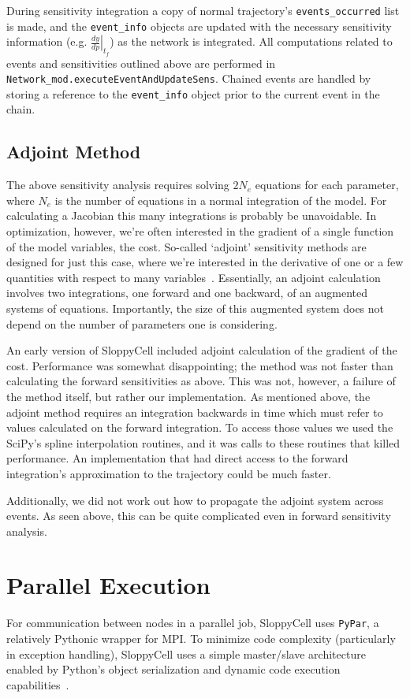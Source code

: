 \documentclass[12pt]{article}
\makeatletter
\newcommand{\py}[1]{\lstinline[language=Python, showstringspaces=False]@#1@}
\makeatother
\begin{document}
During sensitivity integration a copy of normal trajectory's \py{events_occurred} list is made, and the \py{event_info} objects are updated with the necessary sensitivity information (e.g. $\left.\frac{dy}{dp}\right|_{t_f}$) as the network is integrated.
All computations related to events and sensitivities outlined above are performed in \py{Network_mod.executeEventAndUpdateSens}.
Chained events are handled by storing a reference to the \py{event_info} object prior to the current event in the chain.

\subsection{Adjoint Method}
The above sensitivity analysis requires solving $2N_e$ equations for each parameter, where $N_e$ is the number of equations in a normal integration of the model.
For calculating a Jacobian this many integrations is probably be unavoidable.
In optimization, however, we're often interested in the gradient of a single function of the model variables, the cost.
So-called `adjoint' sensitivity methods are designed for just this case, where we're interested in the derivative of one or a few quantities with respect to many variables~\cite{bib:Errico:1997,bib:Cao2002}.
Essentially, an adjoint calculation involves two integrations, one forward and one backward, of an augmented systems of equations.
Importantly, the size of this augmented system does not depend on the number of parameters one is considering.

An early version of SloppyCell included adjoint calculation of the gradient of the cost.
Performance was somewhat disappointing; the method was not faster than calculating the forward sensitivities as above.
This was not, however, a failure of the method itself, but rather our implementation.
As mentioned above, the adjoint method requires an integration backwards in time which must refer to values calculated on the forward integration.
To access those values we used the SciPy's spline interpolation routines, and it was calls to these routines that killed performance.
An implementation that had direct access to the forward integration's approximation to the trajectory could be much faster.

Additionally, we did not work out how to propagate the adjoint system across events.
As seen above, this can be quite complicated even in forward sensitivity analysis.

\section{Parallel Execution}
For communication between nodes in a parallel job, SloppyCell uses \py{PyPar}, a relatively Pythonic wrapper for MPI.
To minimize code complexity (particularly in exception handling), SloppyCell uses a simple master/slave architecture enabled by Python's object serialization and dynamic code execution capabilities~\cite{bib:Myers2007}.
\end{document}
